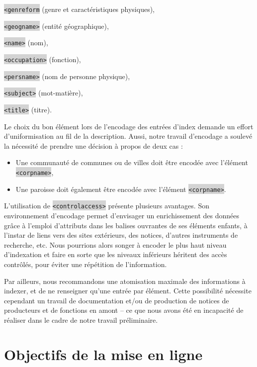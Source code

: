 \documentclass[hidelinks, 13pt]{report}
\newcommand{\code}[1]{\colorbox{LightGray}{\texttt{#1}}}
\begin{document}
	\code{<genreform} (genre et caractéristiques physiques),
	
	\code{<geogname>} (entité géographique),
	
	\code{<name>} (nom),
	
	\code{<occupation>} (fonction),
	
	\code{<persname>} (nom de personne physique),
	
	\code{<subject>} (mot-matière),
	
	\code{<title>} (titre).
	
	Le choix du bon élément lors de l'encodage des entrées d'index demande un effort d'uniformisation au fil de la description. Aussi, notre travail d'encodage a soulevé la nécessité de prendre une décision à propos de deux cas :
	
	\begin{itemize}
		\item Une communauté de communes ou de villes doit être encodée avec l'élément \code{<corpname>},
		\item Une paroisse doit également être encodée avec l'élément \code{<corpname>}.
	\end{itemize}
	
	L'utilisation de \code{<controlaccess>} présente plusieurs avantages. Son environnement d'encodage permet d'envisager un enrichissement des données grâce à l'emploi d'attributs dans les balises ouvrantes de ses éléments enfants, à l'instar de liens vers des sites extérieurs, des notices, d'autres instruments de recherche, etc. Nous pourrions alors songer à encoder le plus haut niveau d'indexation et faire en sorte que les niveaux inférieurs héritent des accès contrôlés, pour éviter une répétition de l'information.
	
	Par ailleurs, nous recommandons une atomisation maximale des informations à indexer, et de ne renseigner qu'une entrée par élément.	Cette possibilité nécessite cependant un travail de documentation et/ou de production de notices de producteurs et de fonctions en amont -- ce que nous avons été en incapacité de réaliser dans le cadre de notre travail préliminaire.
	
	
	
	
	
	
	
	
	
	
	\chapter{Objectifs de la mise en ligne}
	
\end{document}
